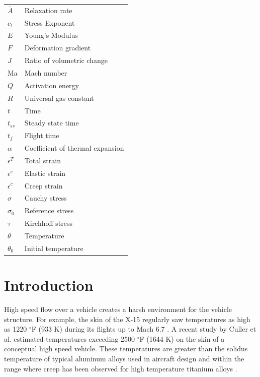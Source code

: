 \documentclass[conf]{new-aiaa}
\begin{document}
{\renewcommand\arraystretch{1.0}
\noindent\begin{longtable*}{@{}l @{\quad=\quad} l@{}}
$\bar{A}$    & Relaxation rate\\
$c_1$        & Stress Exponent\\
$E$          & Young's Modulus \\
$F$          & Deformation gradient\\
$J$          & Ratio of volumetric change\\
Ma           & Mach number\\
$Q$          & Activation energy\\
$R$          & Universal gas constant\\
$t$          & Time\\
$t_{ss}$     & Steady state time\\
$t_{f}$      & Flight time \\
$\alpha$     & Coefficient of thermal expansion\\
$\epsilon^T$ & Total strain\\
$\epsilon^e$ & Elastic strain\\
$\epsilon^c$ & Creep strain\\
$\sigma$     & Cauchy stress\\
$\sigma_0$   & Reference stress\\
$\tau$       & Kirchhoff stress\\
$\theta$     & Temperature\\
$\theta_0$   & Initial temperature
\end{longtable*}}

\section{Introduction} %

High speed flow over a vehicle creates a harsh environment for 
the vehicle structure.
For example, the skin of the X-15 regularly saw temperatures
as high as 1220 $^{\circ}$F (933 K)
during its flights up to Mach 6.7
\cite{ kordes_structureal_heating_experiencs_on_the_x15_airplane}.
A recent study by Culler et al.
\cite{ culler_impact_of_FTS_coupling_on_response_prediction_hypersonic_skin_panels}
estimated temperatures exceeding 2500 $^\circ$F (1644 K) 
on the skin of a conceptual high speed vehicle.
These temperatures are greater than the solidus 
temperature of typical aluminum alloys used in aircraft design
\cite{ SAE_metals_and_alloys_in_the_unified_numbering_system}
and within the range where creep has been observed for 
high temperature titanium alloys 
\cite{
  evans_effects_of_alpha_case_formation_on_creep_fracture_properties_of_the_high_temperature_titanium_alloy_IMI834,
  lavina_creep_behavior_of_Ti6Al4V_from_450C_to_600C}.
\end{document}
